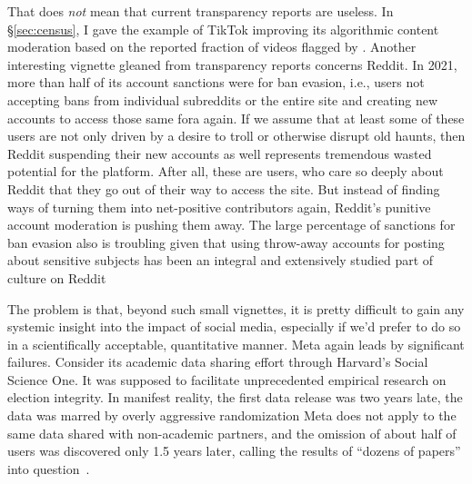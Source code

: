 That does \emph{not} mean that current transparency reports are useless. In
\S\ref{sec:census}, I gave the example of TikTok improving its algorithmic
content moderation based on the reported fraction of videos flagged by .
Another interesting vignette gleaned from transparency reports concerns Reddit.
In 2021, more than half of its account sanctions were for ban evasion, i.e.,
users not accepting bans from individual subreddits or the entire site and
creating new accounts to access those same fora again. If we assume that at
least some of these users are not only driven by a desire to troll or otherwise
disrupt old haunts, then Reddit suspending their new accounts as well represents
tremendous wasted potential for the platform. After all, these are users, who
care so deeply about Reddit that they go out of their way to access the site.
But instead of finding ways of turning them into net-positive contributors
again, Reddit's punitive account moderation is pushing them away. The large
percentage of sanctions for ban evasion also is troubling given that using
throw-away accounts for posting about sensitive subjects has been an integral
and extensively studied part of culture on
Reddit~\cite{AmmariSchoenebeckea2019,AndalibiHaimsonea2016,ChoudhuryDe2014,Leavitt2015,PavalanathanDeChoudhury2015,SchradingOvesdotterAlmea2015}

The problem is that, beyond such small vignettes, it is pretty difficult to gain
any systemic insight into the impact of social media, especially if we'd prefer
to do so in a scientifically acceptable, quantitative manner. Meta again leads
by significant failures. Consider its academic data sharing effort through
Harvard's Social Science One. It was supposed to facilitate unprecedented
empirical research on election integrity. In manifest reality, the first data
release was two years late, the data was marred by overly aggressive
randomization Meta does not apply to the same data shared with non-academic
partners, and the omission of about half of  users was discovered only 1.5
years later, calling the results of ``dozens of papers'' into
question~\cite{Hegelich2020,HegelichMarcoea2020,Ingram2022,OHaraNelson2019,Timberg2021}.

